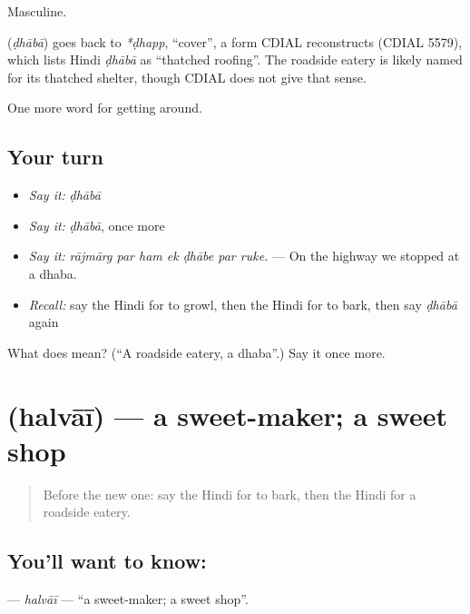 Masculine.

\begin{cousinweb}
\textbf{} (\emph{ḍhābā}) goes back to \emph{*ḍhapp}, \textquotedblleft{}cover\textquotedblright{}, a form CDIAL reconstructs (CDIAL 5579), which lists Hindi \emph{ḍhābā} as \textquotedblleft{}thatched roofing\textquotedblright{}. The roadside eatery is likely named for its thatched shelter, though CDIAL does not give that sense.
\end{cousinweb}

\begin{grammarlens}[title={What you've built}]
One more word for getting around.
\end{grammarlens}

\subsection*{Your turn}
\begin{itemize}
\raggedright
  \item \emph{Say it:} \emph{ḍhābā}
  \item \emph{Say it:} \emph{ḍhābā}, once more
  \item \emph{Say it:} \emph{rājmārg par ham ek ḍhābe par ruke.} — On the highway we stopped at a dhaba.
  \item \emph{Recall:} say the Hindi for to growl, then the Hindi for to bark, then say \emph{ḍhābā} again
\end{itemize}

\begin{tcolorbox}[breakable,colback=teal!4,colframe=teal!35!black,title={Before you move on}]
What does  mean? (\textquotedblleft{}A roadside eatery, a dhaba\textquotedblright{}.) Say it once more.
\end{tcolorbox}
\section[\texorpdfstring{\hi{हलवाई} (halvāī)}{हलवाई (halvāī)}]{ (halvāī) — a sweet-maker; a sweet shop}

\label{lesson:HI-C424-halvai}



\begin{quote}
Before the new one: say the Hindi for to bark, then the Hindi for a roadside eatery.
\end{quote}

\subsection*{You'll want to know: }
\textbf{} — \emph{halvāī} — \textquotedblleft{}a sweet-maker; a sweet shop\textquotedblright{}.

